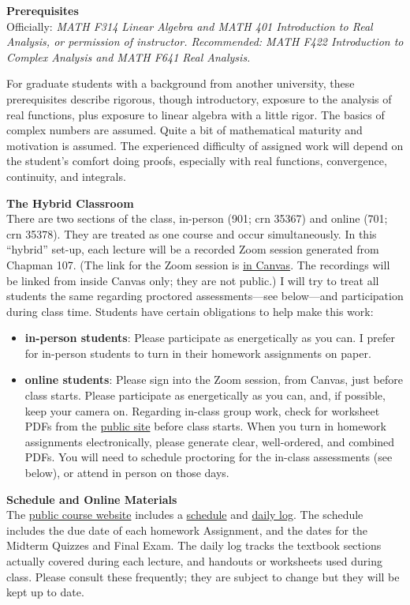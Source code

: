 \documentclass[12pt]{article}
\renewcommand{\emph}[1]{\textsf{\textbf{#1}}}
\newcommand{\localhead}[1]{\par\smallskip\textbf{#1} \smallskip\nobreak\\}%
\def\heading#1{\localhead{\large\emph{#1}}}
\begin{document}
\clearpage\newpage
\phantom{foo}
\heading{Prerequisites}
Officially: \textsl{MATH F314 Linear Algebra and MATH 401 Introduction to Real Analysis, or permission of instructor. Recommended: MATH F422 Introduction to Complex Analysis and MATH F641 Real Analysis.}

For graduate students with a background from another university, these prerequisites describe rigorous, though introductory, exposure to the analysis of real functions, plus exposure to linear algebra with a little rigor.  The basics of complex numbers are assumed.  Quite a bit of mathematical maturity and motivation is assumed.  The experienced difficulty of assigned work will depend on the student's comfort doing proofs, especially with real functions, convergence, continuity, and integrals.


\heading{The Hybrid Classroom}
There are two sections of the class, in-person (901; crn 35367) and online (701; crn 35378).  They are treated as one course and occur simultaneously.  In this ``hybrid'' set-up, each lecture will be a recorded Zoom session generated from Chapman 107.  (The link for the Zoom session is \href{https://canvas.alaska.edu/courses/18441}{in Canvas}.  The recordings will be linked from inside Canvas only; they are not public.)  I will try to treat all students the same regarding proctored assessments---see below---and participation during class time.  Students have certain obligations to help make this work:
\begin{itemize}
\item \textbf{in-person students}: Please participate as energetically as you can.  I prefer for in-person students to turn in their homework assignments on paper.
\item \textbf{online students}:  Please sign into the Zoom session, from Canvas, just before class starts.  Please participate as energetically as you can, and, if possible, keep your camera on.  Regarding in-class group work, check for worksheet PDFs from the \href{https://bueler.github.io/fa/}{public site} before class starts.  When you turn in homework assignments electronically, please generate clear, well-ordered, and combined PDFs.  You will need to schedule proctoring for the in-class assessments (see below), or attend in person on those days.
\end{itemize}


\heading{Schedule and Online Materials}
The \href{https://bueler.github.io/fa/}{public course website} includes a \href{https://bueler.github.io/nla/assets/general/S24/schedule.pdf}{schedule} and \href{https://bueler.github.io/fa/daily.html}{daily log}.  The schedule includes the due date of each homework Assignment, and the dates for the Midterm Quizzes and Final Exam.  The daily log tracks the textbook sections actually covered during each lecture, and handouts or worksheets used during class.  Please consult these frequently; they are subject to change but they will be kept up to date.
\end{document}
